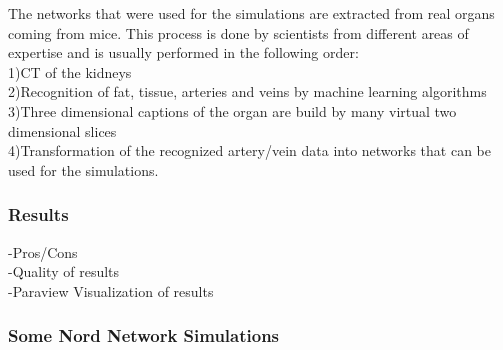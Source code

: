 The networks that were used for the simulations are extracted from real organs coming from mice. This process is done by scientists from different areas of expertise and is usually performed in the following order:
\\1)CT of the kidneys
\\2)Recognition of fat, tissue, arteries and veins by machine learning algorithms
\\3)Three dimensional captions of the organ are build by many virtual two dimensional slices
\\4)Transformation of the recognized artery/vein data into networks that can be used for the simulations.

\subsubsection{Results}
-Pros/Cons
\\-Quality of results
\\-Paraview Visualization of results

\subsubsection*{Some Nord Network Simulations}

